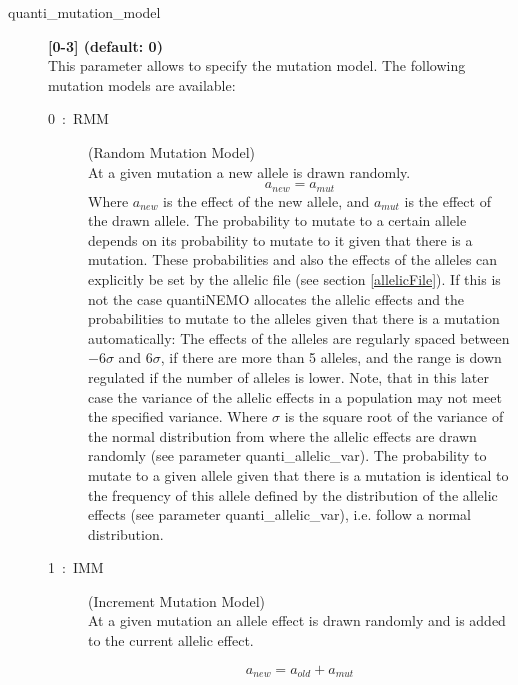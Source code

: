 \documentclass[letterpaper,12pt,oneside]{book}
\begin{document}
\begin{description}
\item[quanti\_mutation\_model] \textbf{[0-3] (default: 0)}\\
This parameter allows to specify the mutation model. The following mutation models are available:
\begin{description}

\item[0~:~RMM] (Random Mutation Model)\\
At a given mutation a new allele is drawn randomly. 
	\[ a_{new} = a_{mut}    \]
Where $a_{new}$ is the effect of the new allele, and $a_{mut}$ is the effect of the drawn allele. The probability to mutate to a certain allele depends on its probability to mutate to it given that there is a mutation. These probabilities and also the effects of the alleles can explicitly be set by the allelic file (see section \ref{allelicFile}). If this is not the case quantiNEMO allocates the allelic effects and the probabilities to mutate to the alleles given that there is a mutation automatically: The effects of the alleles are regularly spaced between $-6\sigma$ and $6\sigma$, if there are more than 5 alleles, and the range is down regulated if the number of alleles is lower. Note, that in this later case the variance of the allelic effects in a population may not meet the specified variance.  Where $\sigma$ is the square root of the variance of the normal distribution from where the allelic effects are drawn randomly (see parameter \textsf{quanti\_allelic\_var}). The probability to mutate to a given allele given that there is a mutation is identical to the frequency of this allele defined by the distribution of the allelic effects (see parameter \textsf{quanti\_allelic\_var}), i.e. follow a normal distribution.

\item[1~:~IMM] (Increment Mutation Model)\\
At a given mutation an allele effect is drawn randomly and is added to the current allelic effect. 

\[ a_{new} = a_{old} + a_{mut}    \]


\end{description}
\end{description}
\end{document}
